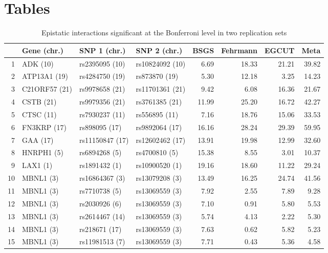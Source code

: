 \documentclass{article}
\begin{document}
\clearpage
\section{Tables}

\begin{table}[ht]
	\centering
	\begin{threeparttable}
		\caption{Epistatic interactions significant at the Bonferroni level in two replication sets}
		\label{tab:bonferroni}
		{\footnotesize
		\begin{tabular}{rlllrrrr}
  \hline
 & Gene (chr.) & SNP 1 (chr.) & SNP 2 (chr.) & BSGS\tnote{2} & Fehrmann\tnote{3} & EGCUT\tnote{3} & Meta\tnote{4} \\
  \hline
1 & ADK (10)  & rs2395095 (10)  & rs10824092 (10)  & 6.69\tnote{1} & 18.33\tnote{1} & 21.21\tnote{1} & 39.82\tnote{1} \\
  2 & ATP13A1 (19)  & rs4284750 (19)  & rs873870 (19)  & 5.30 & 12.18 & 3.25 & 14.23 \\
  3 & C21ORF57 (21)  & rs9978658 (21)  & rs11701361 (21)  & 9.42 & 6.08 & 16.36 & 21.67 \\
  4 & CSTB (21)  & rs9979356 (21)  & rs3761385 (21)  & 11.99 & 25.20 & 16.72 & 42.27 \\
  5 & CTSC (11)  & rs7930237 (11)  & rs556895 (11)  & 7.16 & 18.76 & 15.06 & 33.53 \\
  6 & FN3KRP (17)  & rs898095 (17)  & rs9892064 (17)  & 16.16 & 28.24 & 29.39 & 59.95 \\
  7 & GAA (17)  & rs11150847 (17)  & rs12602462 (17)  & 13.91 & 19.98 & 12.99 & 32.60 \\
  8 & HNRPH1 (5)  & rs6894268 (5)  & rs4700810 (5)  & 15.38 & 8.55 & 3.01 & 10.37 \\
  9 & LAX1 (1)  & rs1891432 (1)  & rs10900520 (1)  & 19.16 & 18.60 & 11.22 & 29.24 \\
  10 & MBNL1 (3)  & rs16864367 (3)  & rs13079208 (3)  & 13.49 & 16.25 & 24.74 & 41.56 \\
  11 & MBNL1 (3)  & rs7710738 (5)  & rs13069559 (3)  & 7.92 & 2.55 & 7.89 & 9.28 \\
  12 & MBNL1 (3)  & rs2030926 (6)  & rs13069559 (3)  & 7.10 & 0.91 & 5.80 & 5.53 \\
  13 & MBNL1 (3)  & rs2614467 (14)  & rs13069559 (3)  & 5.74 & 4.13 & 2.22 & 5.30 \\
  14 & MBNL1 (3)  & rs218671 (17)  & rs13069559 (3)  & 7.63 & 0.62 & 5.82 & 5.23 \\
  15 & MBNL1 (3)  & rs11981513 (7)  & rs13069559 (3)  & 7.71 & 0.43 & 5.36 & 4.58 \\

\end{tabular}}
\end{threeparttable}
\end{table}
\end{document}
